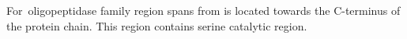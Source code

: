For~\Prolyl oligopeptidase family region spans from is located towards the C-terminus of the protein chain. This region contains serine catalytic region.  